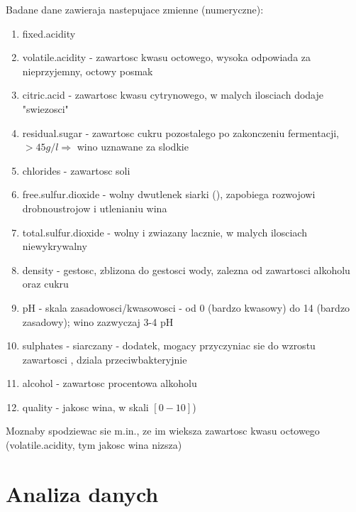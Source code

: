 \documentclass{article}
\begin{document}
Badane dane zawieraja nastepujace zmienne (numeryczne):
\begin{enumerate}
\item fixed.acidity
\item volatile.acidity - zawartosc kwasu octowego, wysoka odpowiada za nieprzyjemny, octowy posmak
\item citric.acid - zawartosc kwasu cytrynowego, w malych ilosciach dodaje "swiezosci"
\item residual.sugar - zawartosc cukru pozostalego po zakonczeniu fermentacji,$ > 45g/l \Rightarrow$ wino uznawane za slodkie
\item chlorides - zawartosc soli
\item free.sulfur.dioxide - wolny dwutlenek siarki (), zapobiega rozwojowi drobnoustrojow i utlenianiu wina
\item total.sulfur.dioxide - wolny i zwiazany  lacznie, w malych ilosciach niewykrywalny
\item density - gestosc, zblizona do gestosci wody, zalezna od zawartosci alkoholu oraz cukru
\item pH - skala zasadowosci/kwasowosci - od 0 (bardzo kwasowy) do 14 (bardzo zasadowy); wino zazwyczaj 3-4 pH
\item sulphates - siarczany - dodatek, mogacy przyczyniac sie do wzrostu zawartosci , dziala przeciwbakteryjnie
\item alcohol - zawartosc procentowa alkoholu
\item quality - jakosc wina, w skali $[0-10]$)
\end{enumerate}

Moznaby spodziewac sie m.in., ze im wieksza zawartosc kwasu octowego (volatile.acidity, tym jakosc wina nizsza)


\section{Analiza danych}
\end{document}
